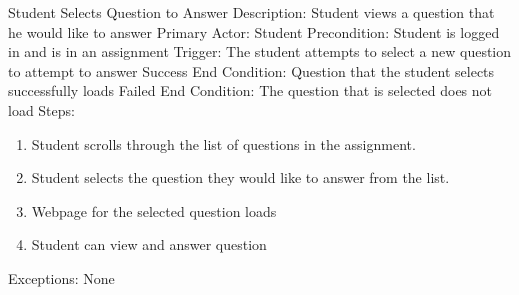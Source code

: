     \begin{section}{Student Selects Question to Answer}
        Description: Student views a question that he would like to answer \newline
        Primary Actor: Student \newline
        Precondition: Student is logged in and is in an assignment         \newline
        Trigger: The student attempts to select a new question      to attempt to answer \newline
        Success End Condition: Question that the student selects     successfully loads \newline
        Failed End Condition: The question that is selected does     not load \newline
        \newline
        Steps:
        \begin{enumerate}
            \item{Student scrolls through the list of questions in the assignment.}
            \item{Student selects the question they would like to        answer from the list.}
            \item{Webpage for the selected question loads}
            \item{Student can view and answer question}
        \end{enumerate}
        Exceptions: None
    \end{section}
    
